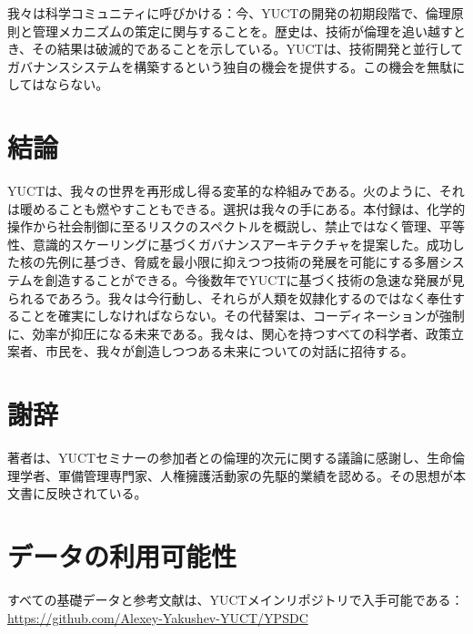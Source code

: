 \documentclass[12pt,a4paper]{article}
\theoremstyle{remark}
\begin{document}
	我々は科学コミュニティに呼びかける：今、YUCTの開発の初期段階で、倫理原則と管理メカニズムの策定に関与することを。歴史は、技術が倫理を追い越すとき、その結果は破滅的であることを示している。YUCTは、技術開発と並行してガバナンスシステムを構築するという独自の機会を提供する。この機会を無駄にしてはならない。
	
	\section{結論}
	\label{sec:conclusion}
	
	YUCTは、我々の世界を再形成し得る変革的な枠組みである。火のように、それは暖めることも燃やすこともできる。選択は我々の手にある。本付録は、化学的操作から社会制御に至るリスクのスペクトルを概説し、禁止ではなく管理、平等性、意識的スケーリングに基づくガバナンスアーキテクチャを提案した。成功した核の先例に基づき、脅威を最小限に抑えつつ技術の発展を可能にする多層システムを創造することができる。今後数年でYUCTに基づく技術の急速な発展が見られるであろう。我々は今行動し、それらが人類を奴隷化するのではなく奉仕することを確実にしなければならない。その代替案は、コーディネーションが強制に、効率が抑圧になる未来である。我々は、関心を持つすべての科学者、政策立案者、市民を、我々が創造しつつある未来についての対話に招待する。
	
	\section*{謝辞}
	著者は、YUCTセミナーの参加者との倫理的次元に関する議論に感謝し、生命倫理学者、軍備管理専門家、人権擁護活動家の先駆的業績を認める。その思想が本文書に反映されている。
	
	\section*{データの利用可能性}
	すべての基礎データと参考文献は、YUCTメインリポジトリで入手可能である： \url{https://github.com/Alexey-Yakushev-YUCT/YPSDC}
	
\end{document}
